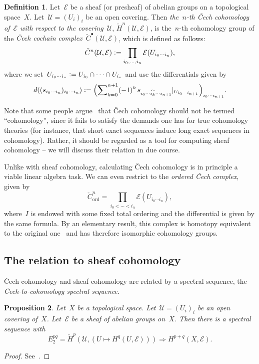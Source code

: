 \documentclass[10pt]{amsart}
\theoremstyle{definition}
\newtheorem{defn}{Definition}[section]
\theoremstyle{plain}
\newtheorem{prop}[defn]{Proposition}
\theoremstyle{remark}
\newcommand{\E}{\mathcal{E}}
\newcommand{\U}{\mathcal{U}}
\newcommand{\defeq}{\vcentcolon=}
\newcommand{\stackhref}[1]{\href{http://stacks.math.columbia.edu/tag/#1}{#1}}
\begin{document}
\begin{defn}Let~$\E$ be a sheaf (or presheaf) of abelian groups on a
topological space~$X$. Let~$\U = (U_i)_i$ be an open covering. Then
\emph{the~$n$-th Čech cohomology of~$\E$ with respect to the covering~$\U$},
$\check H^n(\U,\E)$, is the~$n$-th cohomology group of the \emph{Čech cochain
complex~$\check C^\bullet(\U,\E)$}, which is defined as follows:
\[ \check C^n(\U,\E) \defeq \prod_{i_0,\ldots,i_n} \E(U_{i_0 \cdots i_n}), \]
where we set~$U_{i_0 \cdots i_n} \defeq U_{i_0} \cap \cdots \cap U_{i_n}$ and
use the differentials given by
\[ d ((s_{i_0 \cdots i_n})_{i_0 \cdots i_n}) \defeq
  \Bigl(\sum\nolimits_{k=0}^{n+1} (-1)^k \, s_{i_0 \cdots \widehat{i_k} \cdots
  i_{n+1}}|_{U_{i_0 \cdots i_{n+1}}}\Bigr)_{i_0 \cdots i_{n+1}}. \]
\end{defn}

Note that some people argue~\cite{nLab:cech} that Čech cohomology should not be
termed ``cohomology'', since it fails to satisfy the demands one has for true
cohomology theories (for instance, that short exact sequences induce long exact
sequences in cohomology). Rather, it should be regarded as a tool for computing
sheaf cohomology -- we will discuss their relation in due course.

Unlike with sheaf cohomology, calculating Čech cohomology is in principle a
viable linear algebra task. We can even restrict to the \emph{ordered Čech
complex}, given by
\[ \check C^n_{\text{ord}} = \prod_{i_0 < \cdots < i_n} \E(U_{i_0 \cdots i_n}),
\]
where~$I$ is endowed with some fixed total ordering and the differential is
given by the same formula. By an elementary result, this complex is homotopy
equivalent to the original one~\cite[Tag~\stackhref{01FG}]{stacks-project} and
has therefore isomorphic cohomology groups.


\subsection{The relation to sheaf cohomology}

Čech cohomology and sheaf cohomology are related by a spectral sequence, the
\emph{Čech-to-cohomology spectral sequence}.
\begin{prop}Let~$X$ be a topological space. Let~$\U = (U_i)_i$ be an open
covering of~$X$. Let~$\E$ be a sheaf of abelian groups on~$X$. Then there is a
spectral sequence with
\[ E_2^{pq} = \check H^p(\U, (U \mapsto H^q(U,\E))) \Longrightarrow
  H^{p+q}(X, \E). \]
\end{prop}
\begin{proof}See~\cite[Tag~\stackhref{01ES}]{stacks-project}.
\end{proof}
\end{document}

